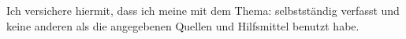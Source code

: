 Ich versichere hiermit, dass ich meine \sDocumentTypePhrase{} mit dem Thema:
\emph{\setDocumentTitle} selbstständig verfasst und keine anderen als die
angegebenen Quellen und Hilfsmittel benutzt habe.

%